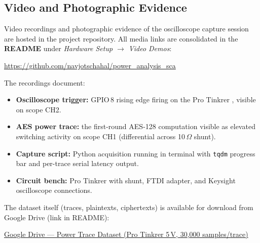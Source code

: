 \subsection{Video and Photographic Evidence}
\label{app:hw:video}

Video recordings and photographic evidence of the oscilloscope capture
session are hosted in the project repository.
All media links are consolidated in the \textbf{README} under
\emph{Hardware Setup $\to$ Video Demos}:

\begin{center}
  \url{https://github.com/navjotschahal/power_analysis_sca}
\end{center}

The recordings document:

\begin{itemize}
  \item \textbf{Oscilloscope trigger:} GPIO\,8 rising edge firing on the
        Pro Tinkrer , visible on scope CH2.
  \item \textbf{AES power trace:} the first-round AES-128 computation visible
        as elevated switching activity on scope CH1 (differential across
        10\,$\Omega$ shunt).
  \item \textbf{Capture script:} Python acquisition running in terminal with
        \texttt{tqdm} progress bar and per-trace serial latency output.
  \item \textbf{Circuit bench:} Pro Tinkrer with shunt, FTDI adapter, and
        Keysight oscilloscope connections.
\end{itemize}

\noindent
The dataset itself (traces, plaintexts, ciphertexts) is available for
download from Google Drive (link in README):

\begin{center}
  \href{https://drive.google.com/file/d/1Itl82UCQEDyk6cYDD33kB-gKtlXIQBZe/view?usp=sharing}%
       {Google Drive --- Power Trace Dataset (Pro Tinkrer 5\,V, 30{,}000 samples/trace)}
\end{center}
